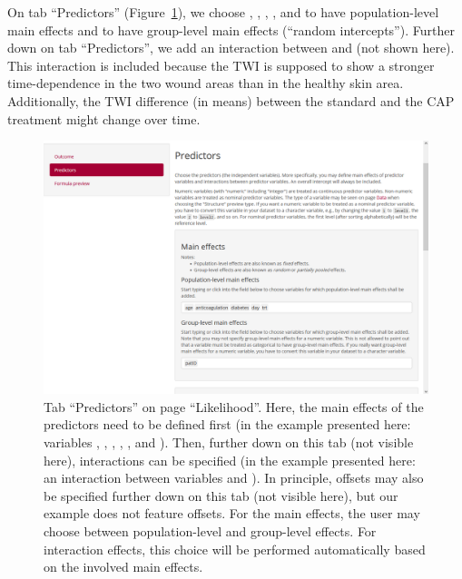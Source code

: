 On tab ``Predictors'' (Figure~\ref{fig:predictors}), we choose
, , , , and
 to have population-level main effects and  to have group-level
main effects (``random intercepts''). Further down on tab
``Predictors'', we add an interaction between  and 
(not shown here). This interaction is included because the
TWI is supposed to show a stronger time-dependence in the two wound areas than
in the healthy skin area. Additionally, the TWI difference (in means) between
the standard and the CAP treatment might change over time.
\begin{figure}[t!]
  \centering
  \includegraphics[width=\textwidth]{Figures/Likelihood_Predictors.png}
  \caption[Tab ``Predictors'']{Tab ``Predictors'' on page ``Likelihood''.
  Here, the main effects of the predictors need to be defined first (in the example presented here:
  variables , , , , , and ).
  Then, further down on this tab (not visible here), interactions can be specified (in the
  example presented here: an interaction between variables  and ).
  In principle, offsets may also be specified further down on this tab (not visible here),
  but our example does not feature offsets. For the main effects, the user may choose between
  population-level and group-level effects. For interaction effects, this choice will be performed 
  automatically based on the involved main effects.}
  \label{fig:predictors}
\end{figure}%

